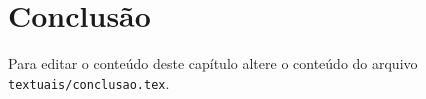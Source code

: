 \chapter{Conclusão}
Para editar o conteúdo deste capítulo altere o conteúdo do arquivo \verb|textuais/conclusao.tex|.